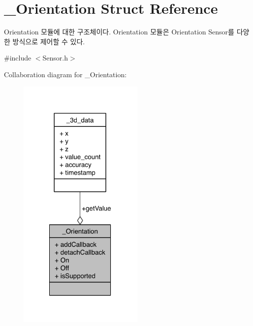 \hypertarget{struct__Orientation}{\section{\-\_\-\-Orientation Struct Reference}
\label{struct__Orientation}
}


Orientation 모듈에 대한 구조체이다. Orientation 모듈은 Orientation Sensor를 다양한 방식으로 제어할 수 있다.  




{\ttfamily \#include $<$Sensor.\-h$>$}



Collaboration diagram for \-\_\-\-Orientation\-:\nopagebreak
\begin{figure}[H]
\begin{center}
\leavevmode
\includegraphics[width=173pt]{d5/dad/struct__Orientation__coll__graph}
\end{center}
\end{figure}
